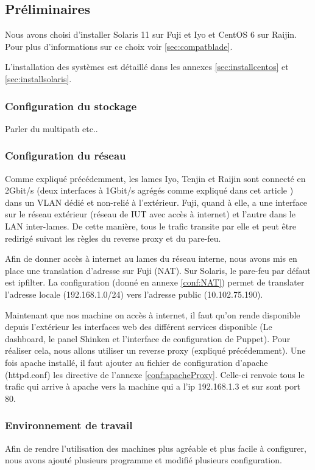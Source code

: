 \documentclass[a4paper,oneside]{report}
\begin{document}
\subsection{Préliminaires}
Nous avons choisi d'installer Solaris 11 sur Fuji et Iyo et CentOS 6 sur Raijin.
Pour plus d'informations sur ce choix voir \ref{sec:compatblade}.

L'installation des systèmes est détaillé dans les annexes \ref{sec:installcentos} et \ref{sec:installsolaris}.

\subsubsection{Configuration du stockage}
Parler du multipath etc..

\subsubsection{Configuration du réseau}
Comme expliqué précédemment, les lames Iyo, Tenjin et Raijin sont connecté en 2Gbit/s (deux interfaces à 1Gbit/s agrégés comme expliqué dans cet article \cite{SolarisLA}) dans un VLAN dédié et non-relié à l'extérieur.
Fuji, quand à elle, a une interface sur le réseau extérieur (réseau de IUT avec accès à internet) et l'autre dans le LAN inter-lames.
De cette manière, tous le trafic transite par elle et peut être redirigé suivant les règles du reverse proxy et du pare-feu. 

Afin de donner accès à internet au lames du réseau interne, nous avons mis en place une translation d'adresse sur Fuji (NAT).
Sur Solaris, le pare-feu par défaut est ipfilter. La configuration (donné en annexe \ref{conf:NAT}) permet de translater l'adresse locale (192.168.1.0/24) vers l'adresse public (10.102.75.190).

Maintenant que nos machine on accès à internet, il faut qu'on rende disponible depuis l'extérieur les interfaces web des différent services disponible (Le dashboard, le panel Shinken et l'interface de configuration de Puppet).
Pour réaliser cela, nous allons utiliser un reverse proxy (expliqué précédemment). Une fois apache installé, il faut ajouter au fichier de configuration d'apache (httpd.conf) les directive de l'annexe \ref{conf:apacheProxy}.
Celle-ci renvoie tous le trafic qui arrive à apache vers la machine qui a l'ip 192.168.1.3 et sur sont port 80.

\subsubsection{Environnement de travail}
Afin de rendre l'utilisation des machines plus agréable et plus facile à configurer, nous avons ajouté plusieurs programme et modifié plusieurs configuration.
\end{document}
